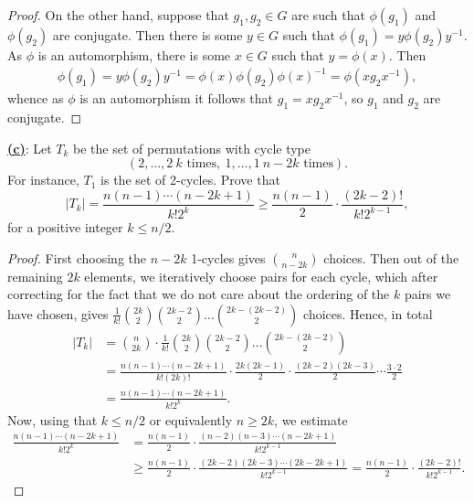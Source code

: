\documentclass[12pt]{article}
\begin{document}
\begin{homeworkProblem}
\begin{proof}
    On the other hand, suppose that $ g_{1},g_{2}\in G $ are such that $ \phi(g_{1}) $ and $ \phi(g_{2}) $ are conjugate. Then there is some $ y\in G $ such that $ \phi(g_{1}) = y \phi(g_{2}) y^{-1} $. As $ \phi $ is an automorphism, there is some $ x \in G $ such that $ y = \phi(x) $. Then 
    \begin{align*}
      \phi(g_{1}) = y \phi(g_{2}) y^{-1} = \phi(x) \phi(g_{2}) \phi(x)^{-1} = \phi(xg_{2}x^{-1}),
    \end{align*}
    whence as $ \phi $ is an automorphism it follows that $ g_{1} = xg_{2}x^{-1} $, so $ g_{1} $ and $ g_{2} $ are conjugate.
  \end{proof}

  \underline{\textbf{(c)}}: Let $T_k$ be the set of permutations with cycle type
  \[
    (2, \dots, 2\ \text{$k$ times},\ 1, \dots, 1\ \text{$n - 2k$ times}).
  \]
  For instance, $T_1$ is the set of 2-cycles. Prove that
  \[
    \lvert T_k \rvert = \frac{n(n-1)\cdots (n - 2k + 1)}{k! 2^k}
    \ge \frac{n(n-1)}{2} \cdot \frac{(2k - 2)!}{k! 2^{k-1}},
  \]
  for a positive integer $k \le n/2$.\\

  \begin{proof}
    First choosing the $ n-2k $ 1-cycles gives $ \binom{n}{n-2k} $ choices. Then out of the remaining $ 2k $ elements, we iteratively choose pairs for each cycle, which after correcting for the fact that we do not care about the ordering of the $ k $ pairs we have chosen, gives $ \frac{1}{k!}\binom{2k}{2}\binom{2k-2}{2}\ldots \binom{2k-(2k-2)}{2} $ choices. Hence, in total
    \begin{align*}
      |T_{k}| &= \binom{n}{2k} \cdot \frac{1}{k!}\binom{2k}{2}\binom{2k-2}{2}\ldots \binom{2k-(2k-2)}{2}\\
      &= \frac{n(n-1)\cdots(n-2k+1)}{k!(2k)!} \cdot \frac{2k(2k-1)}{2}\cdot \frac{(2k-2)(2k-3)}{2} \cdots \frac{3\cdot 2}{2} \\
      &= \frac{n(n-1)\cdots(n-2k+1)}{k!2^{k}}.
    \end{align*}
    Now, using that $ k\leq n/2 $ or equivalently $ n\geq 2k $, we estimate
    \begin{align*}
      \frac{n(n-1)\cdots(n-2k+1)}{k!2^{k}} &= \frac{n(n-1)}{2}\cdot  \frac{(n-2)(n-3)\cdots (n-2k+1)}{k!2^{k-1}}\\
      &\geq \frac{n(n-1)}{2} \cdot\frac{(2k-2)(2k-3)\cdots (2k-2k+1)}{k!2^{k-1}} = \frac{n(n-1)}{2}\cdot \frac{(2k-2)!}{k!2^{k-1}}.
    \end{align*}
  

\end{proof}
\end{homeworkProblem}
\end{document}
